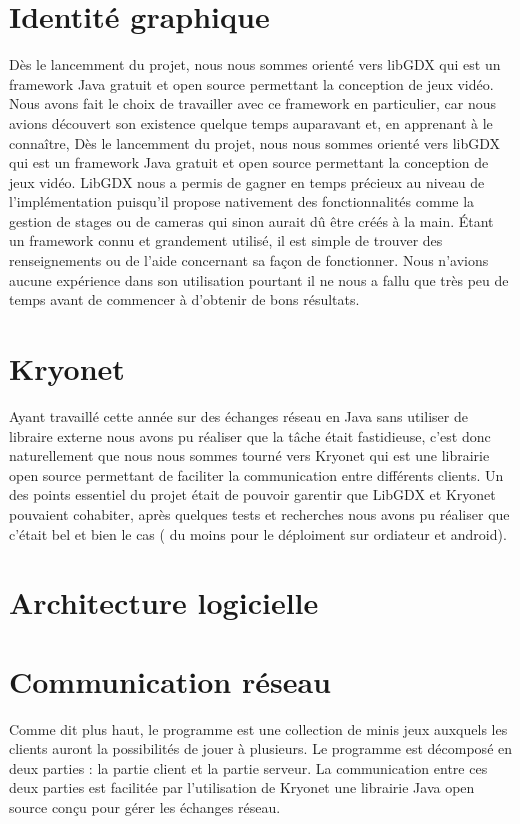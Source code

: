 \documentclass{report}
\begin{document}
\chapter{Identité graphique}
Dès le lancemment du projet, nous nous sommes orienté vers libGDX qui est un
framework Java gratuit et open source permettant la conception de jeux vidéo.
Nous avons fait le choix de travailler avec ce framework en particulier, car
nous avions découvert son existence quelque temps auparavant et, en apprenant à le connaître,
Dès le lancemment du projet, nous nous sommes orienté vers libGDX qui est un framework Java gratuit et open source permettant la conception de jeux vidéo.
LibGDX nous a permis de gagner en temps précieux au niveau de l’implémentation
puisqu’il propose nativement des fonctionnalités comme la gestion de stages ou
de cameras qui sinon aurait dû être créés à la main.
Étant un framework connu et grandement utilisé, il est simple de trouver des
renseignements ou de l’aide concernant sa façon de fonctionner. Nous n’avions
aucune expérience dans son utilisation pourtant il ne nous a fallu que très peu
 de temps avant de commencer à d’obtenir de bons résultats.

\chapter{Kryonet}
Ayant travaillé cette année sur des échanges réseau en Java sans utiliser de libraire externe nous avons pu réaliser que la tâche était fastidieuse, c'est donc naturellement que nous
nous sommes tourné vers Kryonet qui est une librairie open source permettant de faciliter la communication entre différents clients. Un des points essentiel du projet était de pouvoir
garentir que LibGDX et Kryonet pouvaient cohabiter, après quelques tests et recherches nous avons pu réaliser que c'était bel et bien le cas ( du moins pour le déploiment sur ordiateur et android).

\chapter{Architecture logicielle}

\chapter{Communication réseau}
Comme dit plus haut, le programme est une collection de minis jeux auxquels les clients auront la possibilités de jouer à
plusieurs. Le programme est décomposé en deux parties : la partie client et la partie serveur. La communication entre ces
deux parties est facilitée par l'utilisation de Kryonet une librairie Java open source conçu pour gérer les échanges réseau.
\end{document}
